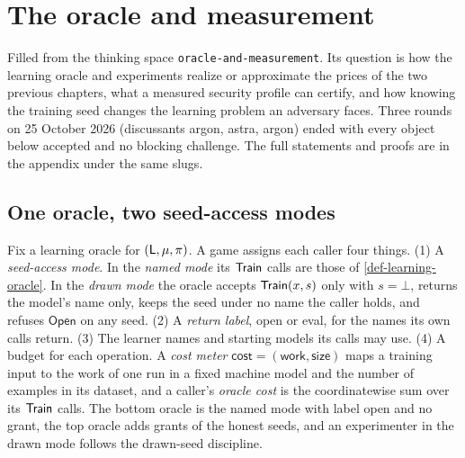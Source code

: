 \chapter{The oracle and measurement}\label{ch:oracle-and-measurement}
Filled from the thinking space \texttt{oracle-and-measurement}. Its question is how
the learning oracle and experiments realize or approximate the prices of the two
previous chapters, what a measured security profile can certify, and how knowing
the training seed changes the learning problem an adversary faces. Three rounds
on 25 October 2026 (discussants argon, astra, argon) ended with every object
below accepted and no blocking challenge. The full statements and proofs are in
the appendix under the same slugs.

\section{One oracle, two seed-access modes}

\begin{definition}
Fix a learning oracle for $(\mathsf{L},\mu,\pi)$. A game assigns each caller four things.
(1) A \emph{seed-access mode}. In the \emph{named mode} its $\mathsf{Train}$ calls are those
of \cref{def-learning-oracle}. In the \emph{drawn mode} the oracle accepts
$\mathsf{Train}(x,s)$ only with $s=\bot$, returns the model's name only, keeps the seed
under no name the caller holds, and refuses $\mathsf{Open}$ on any seed. (2) A
\emph{return label}, open or eval, for the names its own calls return. (3) The
learner names and starting models its calls may use. (4) A budget for each
operation. A \emph{cost meter} $\mathsf{cost}=(\mathsf{work},\mathsf{size})$ maps a
training input to the work of one run in a fixed machine model and the number of
examples in its dataset, and a caller's \emph{oracle cost} is the coordinatewise
sum over its $\mathsf{Train}$ calls. The bottom oracle is the named mode with label open
and no grant, the top oracle adds grants of the honest seeds, and an experimenter
in the drawn mode follows the drawn-seed discipline.
\end{definition}

